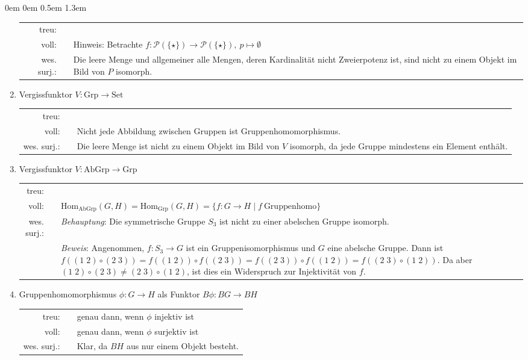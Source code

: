 \documentclass[a4paper,ngerman]{scrartcl}
\newcommand{\cmark}{\ding{51}}
\newcommand{\xmark}{\ding{55}}
\theoremstyle{definition}
\theoremstyle{plain}
\theoremstyle{remark}
\newcommand{\Hom}{\mathrm{Hom}}
\newcommand{\Set}{\mathrm{Set}}
\newcommand{\Grp}{\mathrm{Grp}}
\newcommand{\AbGrp}{\mathrm{AbGrp}}
\begin{document}
\begin{list}{}{0em \leftmargin0em \itemindent0.5em \itemsep 1.3em}
\begin{enumerate}
\setlength{\tabcolsep}{3pt}
\begin{tabular}{ r c p{12cm} }
  treu: & \cmark &\\
  voll: & \xmark & Hinweis: Betrachte $f:\mathcal{P}(\{\star\}) \to \mathcal{P}(\{\star\}),\ p \mapsto \emptyset$\\
  wes. surj.: & \xmark & Die leere Menge und allgemeiner alle Mengen, deren Kardinalität nicht Zweierpotenz ist, sind nicht zu einem Objekt im Bild von $P$ isomorph.
\end{tabular}

\item Vergissfunktor $V : \Grp \to \Set$

\begin{tabular}{ r c p{12cm} }
  treu: & \cmark &\\
  voll: & \xmark & Nicht jede Abbildung zwischen Gruppen ist Gruppenhomomorphismus.\\
  wes. surj.: & \xmark & Die leere Menge ist nicht zu einem Objekt im Bild von $V$ isomorph, da jede Gruppe mindestens ein Element enthält.
\end{tabular}

\item Vergissfunktor $V : \AbGrp \to \Grp$

\begin{tabular}{ r c p{12cm} }
  treu: & \cmark &\\
  voll: & \cmark &$\Hom_\AbGrp(G, H) = \Hom_\Grp(G, H) = \{ f : G \to H \mid f\ \text{Gruppenhomo} \}$\\
  wes. surj.: & \xmark & \emph{Behauptung}: Die symmetrische Gruppe $S_3$ ist nicht zu einer abelschen Gruppe isomorph.\\
  & & \emph{Beweis}: Angenommen, $f:S_3 \to G$ ist ein Gruppenisomorphismus und $G$ eine abelsche Gruppe. Dann ist $f((1\;2) \circ (2\;3)) = f((1\;2)) \circ f((2\;3)) = f((2\;3)) \circ f((1\;2)) = f((2\;3) \circ (1\;2))$. Da aber $(1\;2) \circ (2\;3) \ne (2\;3) \circ (1\;2)$, ist dies ein Widerspruch zur Injektivität von $f$.
\end{tabular}

\item Gruppenhomomorphismus $\phi : G \to H$ als Funktor $B\phi : BG \to BH$

\begin{tabular}{ r c p{12cm} }
  treu: & & genau dann, wenn $\phi$ injektiv ist\\
  voll: & & genau dann, wenn $\phi$ surjektiv ist\\
  wes. surj.: & \cmark & Klar, da $BH$ aus nur einem Objekt besteht.
\end{tabular}
\end{enumerate}


\end{list}
\end{document}
